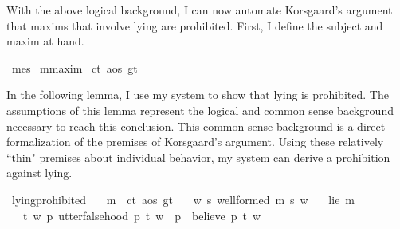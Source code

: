 \begin{isabellebody}
\begin{isamarkuptext}
With the above logical background, I can now automate Korsgaard's argument that maxims that involve
lying are prohibited. First, I define the subject and maxim at hand.%
\end{isamarkuptext}\isamarkuptrue%
\isamarkupfalse%
\ me{\isacharcolon}{\isacharcolon}s\isanewline
%
\isanewline
{}\isamarkupfalse%
\ m{\isacharcolon}{\isacharcolon}maxim\isanewline
%
\isanewline
{}\isamarkupfalse%
\ c{\isacharcolon}{\isacharcolon}t\ a{\isacharcolon}{\isacharcolon}os\ g{\isacharcolon}{\isacharcolon}t\isanewline
%
%
\begin{isamarkuptext}%
In the following lemma, I use my system to show that lying is prohibited. The assumptions of 
this lemma represent the logical and common sense background necessary to reach this conclusion. This
common sense background is a direct formalization of the premises of Korsgaard's argument. Using these
relatively ``thin" premises about individual behavior, my system can derive a prohibition against lying.%
\end{isamarkuptext}\isamarkuptrue%
\isamarkupfalse%
\ lying{\isacharunderscore}prohibited{\isacharcolon}\isanewline
\ \ \ {\isachardoublequoteopen}m\ {\isasymequiv}\ {\isacharparenleft}c{\isacharcolon}{\isacharcolon}t{\isacharcomma}\ a{\isacharcolon}{\isacharcolon}os{\isacharcomma}\ g{\isacharcolon}{\isacharcolon}t{\isacharparenright}{\isachardoublequoteclose}\isanewline
\ \ \ {\isachardoublequoteopen}{\isasymforall}w{\isachardot}\ {\isasymforall}s{\isachardot}\ well{\isacharunderscore}formed\ m\ s\ w{\isachardoublequoteclose}\isanewline
%
\isanewline
\ \ \ {\isachardoublequoteopen}lie\ m{\isachardoublequoteclose}\isanewline
%
\isanewline
\ \ \ {\isachardoublequoteopen}{\isasymforall}t\ w{\isachardot}\ {\isacharparenleft}{\isacharparenleft}{\isasymforall}p{\isachardot}\ utter{\isacharunderscore}falsehood\ p\ t\ w{\isacharparenright}\ {\isasymlongrightarrow}\ {\isacharparenleft}{\isasymforall}p{\isachardot}\ \isactrlbold {\isasymnot}\ {\isacharparenleft}believe\ p\ t{\isacharparenright}\ w{\isacharparenright}{\isacharparenright}{\isachardoublequoteclose}\isanewline

\end{isabellebody}
